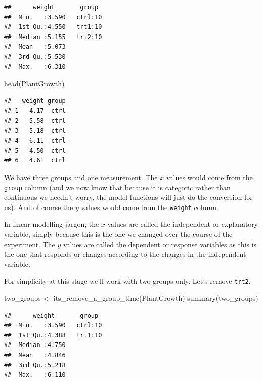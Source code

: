 \documentclass[
]{book}
\newenvironment{Shaded}{\begin{snugshade}}{\end{snugshade}}
\newcommand{\FunctionTok}[1]{\textcolor[rgb]{0.00,0.00,0.00}{#1}}
\newcommand{\NormalTok}[1]{#1}
\newcommand{\OtherTok}[1]{\textcolor[rgb]{0.56,0.35,0.01}{#1}}
\begin{document}
\begin{verbatim}
##      weight       group   
##  Min.   :3.590   ctrl:10  
##  1st Qu.:4.550   trt1:10  
##  Median :5.155   trt2:10  
##  Mean   :5.073            
##  3rd Qu.:5.530            
##  Max.   :6.310
\end{verbatim}

\begin{Shaded}
\begin{Highlighting}[]
\FunctionTok{head}\NormalTok{(PlantGrowth)}
\end{Highlighting}
\end{Shaded}

\begin{verbatim}
##   weight group
## 1   4.17  ctrl
## 2   5.58  ctrl
## 3   5.18  ctrl
## 4   6.11  ctrl
## 5   4.50  ctrl
## 6   4.61  ctrl
\end{verbatim}

We have three groups and one measurement. The \(x\) values would come from the \texttt{group} column (and we now know that because it is categoric rather than continuous we needn't worry, the model functions will just do the conversion for us). And of course the \(y\) values would come from the \texttt{weight} column.

In linear modelling jargon, the \(x\) values are called the independent or explanatory variable, simply because this is the one we changed over the course of the experiment. The \(y\) values are called the dependent or response variables as this is the one that responds or changes according to the changes in the independent variable.

For simplicity at this stage we'll work with two groups only. Let's remove \texttt{trt2}.

\begin{Shaded}
\begin{Highlighting}[]
\NormalTok{two\_groups }\OtherTok{\textless{}{-}} \FunctionTok{its\_remove\_a\_group\_time}\NormalTok{(PlantGrowth)}
\FunctionTok{summary}\NormalTok{(two\_groups)}
\end{Highlighting}
\end{Shaded}

\begin{verbatim}
##      weight       group   
##  Min.   :3.590   ctrl:10  
##  1st Qu.:4.388   trt1:10  
##  Median :4.750            
##  Mean   :4.846            
##  3rd Qu.:5.218            
##  Max.   :6.110
\end{verbatim}
\end{document}
